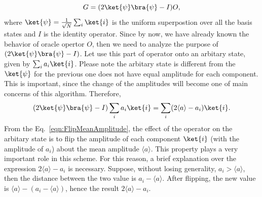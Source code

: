 \begin{equation}
    G=(2\ket{\psi}\bra{\psi}-I)O,
\end{equation}
where $\ket{\psi}=\frac{1}{\sqrt{N}}\sum_i\ket{i}$ is the uniform superpostion over all the basis states and $I$ is the identity operator. Since by now, we have already known the behavior of oracle opertor $O$, then we need to analyze the purpose of $(2\ket{\psi}\bra{\psi}-I)$. Let use this part of operator onto an arbitary state, given by $\sum_i a_i\ket{i}$. Please note the arbitary state is different from the $\ket{\psi}$ for the previous one does not have equal amplitude for each component. This is important, since the change of the amplitudes will become one of main concerns of this algorithm. Therefore,
\begin{equation}
    (2\ket{\psi}\bra{\psi}-I)\sum_i a_i\ket{i}=\sum_i(2\langle a\rangle-a_i)\ket{i}.
    \label{eqn:FlipMeanAmplitude}
\end{equation}
From the Eq.~\ref{eqn:FlipMeanAmplitude}, the effect of the operator on the arbitary state is to flip the amplitude of each component $\ket{i}$ (with the amplitude of $a_i$) about the mean amplitude $\langle a\rangle$. This property plays a very important role in this scheme. For this reason, a brief explanation over the expression $2\langle a\rangle-a_i$ is necessary. Suppose, without losing generality, $a_i>\langle a\rangle$, then the distance between the two value is $a_i-\langle a\rangle$. After flipping, the new value is $\langle a\rangle -(a_i-\langle a\rangle)$, hence the result $2\langle a\rangle-a_i$. 

